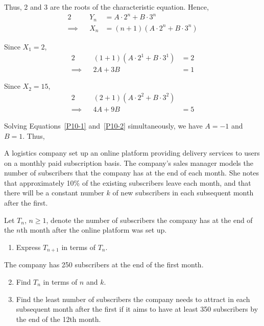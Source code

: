 \documentclass{echw}
\begin{document}
        Thus, 2 and 3 are the roots of the characteristic equation. Hence,
        \begin{alignat*}{2}
            &&Y_n &= A \cdot 2^n + B \cdot 3^n\\
            \implies&&X_n &= (n+1)\left(A \cdot 2^n + B \cdot 3^n\right)
        \end{alignat*}

        Since $X_1 = 2$,
        \begin{alignat}{2}
            &&(1+1)\left(A \cdot 2^1 + B \cdot 3^1\right) &= 2\nonumber\\
            \implies&&2A + 3B &= 1\label{P10-1}
        \end{alignat}

        Since $X_2 = 15$,
        \begin{alignat}{2}
            &&(2+1)\left(A \cdot 2^2 + B \cdot 3^2\right)\nonumber\\
            \implies&&4A + 9B &= 5\label{P10-2}
        \end{alignat}

        Solving Equations~\ref{P10-1} and~\ref{P10-2} simultaneously, we have $A = -1$ and $B = 1$. Thus,


    \problem{}
        A logistics company set up an online platform providing delivery services to users on a monthly paid subscription basis. The company's sales manager models the number of subscribers that the company has at the end of each month. She notes that approximately 10\% of the existing subscribers leave each month, and that there will be a constant number $k$ of new subscribers in each subsequent month after the first.

        Let $T_n$, $n \geq 1$, denote the number of subscribers the company has at the end of the $n$th month after the online platform was set up.

        \begin{enumerate}
            \item Express $T_{n+1}$ in terms of $T_n$.
        \end{enumerate}

        The company has 250 subscribers at the end of the first month.

        \begin{enumerate}
            \setcounter{enumi}{1}
            \item Find $T_n$ in terms of $n$ and $k$.
            \item Find the least number of subscribers the company needs to attract in each subsequent month after the first if it aims to have at least 350 subscribers by the end of the 12th month.
        \end{enumerate}
\end{document}
